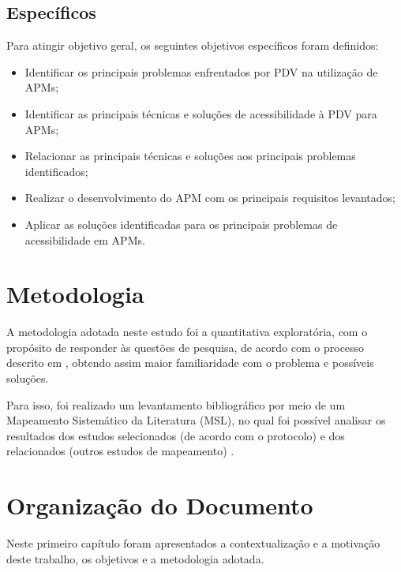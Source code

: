 \subsection{Específicos}

Para atingir objetivo geral, os seguintes objetivos específicos foram definidos:

\begin{itemize}
    \item Identificar os principais problemas enfrentados por PDV na utilização de APMs;
    \item Identificar as principais técnicas e soluções de acessibilidade à PDV para APMs;
    \item Relacionar as principais técnicas e soluções aos principais problemas identificados;
    \item Realizar o desenvolvimento do APM com os principais requisitos levantados;
    \item Aplicar as soluções identificadas para os principais problemas de acessibilidade em APMs\@.
\end{itemize}

\section{Metodologia}

A metodologia adotada neste estudo foi a quantitativa exploratória, com o propósito de responder às questões de
pesquisa, de acordo com o processo descrito em , obtendo assim maior familiaridade
com o problema e possíveis soluções.

Para isso, foi realizado um levantamento bibliográfico por meio de um Mapeamento Sistemático da Literatura (MSL), no qual foi possível
analisar os resultados dos estudos selecionados (de acordo com o protocolo) e dos relacionados (outros estudos de mapeamento) \cite{Kitchenham2007}.

\section{Organização do Documento}
Neste primeiro capítulo foram apresentados a contextualização e a motivação deste trabalho, os objetivos e a metodologia adotada.


